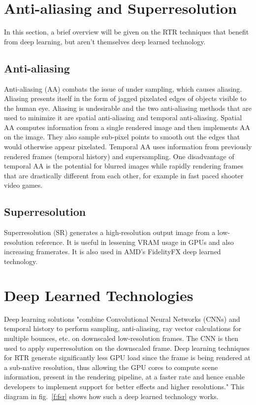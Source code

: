 \documentclass[10pt,oneside,english,a4paper]{article}
\begin{document}
\section{Anti-aliasing and Superresolution} \label{aasr}

In this section, a brief overview will be given on the RTR techniques that benefit from deep learning, but aren't themselves deep learned technology.

\subsection{Anti-aliasing} \label{aasr:aa}

Anti-aliasing (AA) combats the issue of under sampling, which causes aliasing. Aliasing presents itself in the form of jagged pixelated edges of objects visible to the human eye. Aliasing is undesirable and the two anti-aliasing methods that are used to minimize it are spatial anti-aliasing and temporal anti-aliasing.\cite{9441822}
Spatial AA computes information from a single rendered image and then implements AA on the image. They also sample sub-pixel points to smooth out the edges that would otherwise appear pixelated.\cite{9441822}
Temporal AA uses information from previously rendered frames (temporal history) and supersampling.\cite{9441822} One disadvantage of temporal AA is the potential for blurred images while rapidly rendering frames that are drastically different from each other, for example in fast paced shooter video games.

\subsection{Superresolution} \label{aasr:sr}

Superresolution (SR) generates a high-resolution output image from a low-resolution reference. It is useful in lessening VRAM usage in GPUs and also increasing framerates.\cite{8723565} It is also used in AMD's FidelityFX deep learned technology.

\section{Deep Learned Technologies} \label{deep}

Deep learning solutions "combine Convolutional Neural Networks (CNNs) and temporal history to perform sampling, anti-aliasing, ray vector calculations for multiple bounces, etc. on downscaled low-resolution frames. The CNN is then used to apply superresolution on the downscaled frame. Deep learning techniques for RTR generate significantly less GPU load since the frame is being rendered at a sub-native resolution, thus allowing the GPU cores to compute scene information, present in the rendering pipeline, at a faster rate and hence enable developers to implement support for better effects and higher resolutions."\cite{9441822} This diagram in fig.~\ref{f:fsr} shows how such a deep learned technology works.
\end{document}
